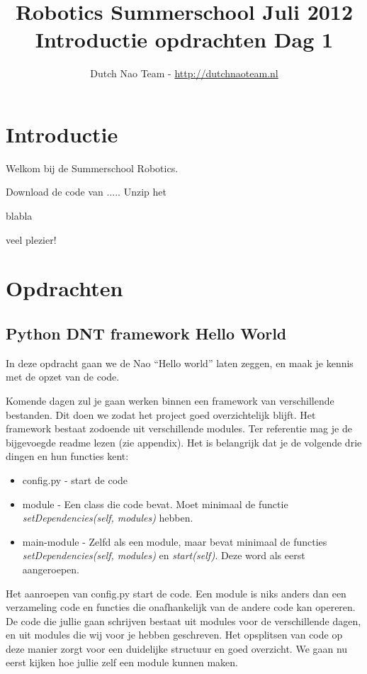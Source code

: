 \documentclass[a4paper]{article}
\title{\textbf{Robotics Summerschool Juli 2012} \\ Introductie opdrachten Dag 1}
\author{Dutch Nao Team - \url{http://dutchnaoteam.nl}}
\date{}
\begin{document}
\maketitle

\section{Introductie}
Welkom bij de Summerschool Robotics.

Download de code van .....
Unzip het 

blabla

veel plezier!


\tableofcontents

\newpage


\section{Opdrachten}

\subsection{Python DNT framework Hello World}
In deze opdracht gaan we de Nao ``Hello world'' laten zeggen, en maak je kennis met de opzet van de code.

Komende dagen zul je gaan werken binnen een framework van verschillende bestanden. Dit doen we zodat het project goed overzichtelijk blijft. Het framework bestaat zodoende uit verschillende modules. Ter referentie mag je de bijgevoegde readme lezen (zie appendix). Het is belangrijk dat je de volgende drie dingen en hun functies kent:
\begin{itemize}
\item config.py - start de code
\item module - Een class die code bevat. Moet minimaal de functie \textit{setDependencies(self, modules)} hebben.
\item main-module - Zelfd als een module, maar bevat minimaal de functies \textit{setDependencies(self, modules)} en \textit{start(self)}. Deze word als eerst aangeroepen.
\end{itemize}

Het aanroepen van config.py start de code. Een module is niks anders dan een verzameling code en functies die onafhankelijk van de andere code kan opereren. De code die jullie gaan schrijven bestaat uit modules voor de verschillende dagen, en uit modules die wij voor je hebben geschreven. Het opsplitsen van code op deze manier zorgt voor een duidelijke structuur en goed overzicht. We gaan nu eerst kijken hoe jullie zelf een module kunnen maken.
\end{document}
